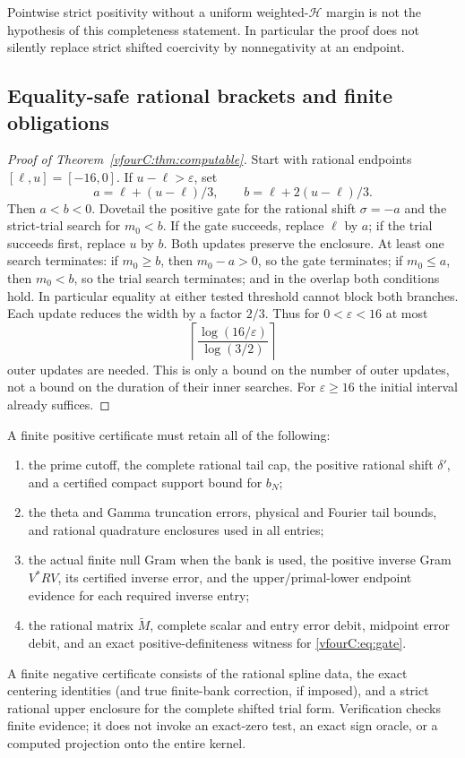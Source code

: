 \documentclass[11pt,a4paper]{article}
\numberwithin{equation}{section}
\theoremstyle{definition}\newtheorem{definition}[theorem]{Definition}
\theoremstyle{remark}\newtheorem{remark}[theorem]{Remark}
\newcommand{\Hh}{\mathcal H}\newcommand{\Hw}{\mathcal H}
\begin{document}
Pointwise strict positivity without a uniform weighted-$\Hh$ margin is not the
hypothesis of this completeness statement.  In particular the proof does not
silently replace strict shifted coercivity by nonnegativity at an endpoint.

\subsection{Equality-safe rational brackets and finite obligations}
\label{vfourC:subsec:brackets}

\begin{proof}[Proof of Theorem~\ref{vfourC:thm:computable}]
Start with rational endpoints $[\ell,u]=[-16,0]$.  If $u-\ell>\varepsilon$, set
\[
 a=\ell+(u-\ell)/3,\qquad b=\ell+2(u-\ell)/3.
\]
Then $a<b<0$.  Dovetail the positive gate for the rational shift $\sigma=-a$
and the strict-trial search for $m_0<b$.  If the gate succeeds, replace
$\ell$ by $a$; if the trial succeeds first, replace $u$ by $b$.
Both updates preserve the enclosure.  At least one search terminates:
if $m_0\ge b$, then $m_0-a>0$, so the gate terminates; if $m_0\le a$, then
$m_0<b$, so the trial search terminates; and in the overlap both conditions
hold.  In particular equality at either tested threshold cannot block both
branches.  Each update reduces the width by a factor $2/3$.  Thus for
$0<\varepsilon<16$ at most
\[
 \left\lceil\frac{\log(16/\varepsilon)}{\log(3/2)}\right\rceil
\]
outer updates are needed.  This is only a bound on the number of outer updates,
not a bound on the duration of their inner searches.  For $\varepsilon\ge16$
the initial interval already suffices.
\end{proof}

A finite positive certificate must retain all of the following:
\begin{enumerate}[label=(\roman*)]
 \item the prime cutoff, the complete rational tail cap, the positive rational
       shift $\delta'$, and a certified compact support bound for $b_N$;
 \item the theta and Gamma truncation errors, physical and Fourier tail bounds,
       and rational quadrature enclosures used in all entries;
 \item the actual finite null Gram when the bank is used, the positive inverse
       Gram $V^*RV$, its certified inverse error, and the upper/primal-lower
       endpoint evidence for each required inverse entry;
 \item the rational matrix $\widetilde M$, complete scalar and entry error
       debit, midpoint error debit, and an exact positive-definiteness witness
       for \eqref{vfourC:eq:gate}.
\end{enumerate}
A finite negative certificate consists of the rational spline data, the exact
centering identities (and true finite-bank correction, if imposed), and a
strict rational upper enclosure for the complete shifted trial form.
Verification checks finite evidence; it does not invoke an exact-zero test,
an exact sign oracle, or a computed projection onto the entire kernel.
\end{document}

